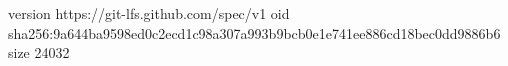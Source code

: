 version https://git-lfs.github.com/spec/v1
oid sha256:9a644ba9598ed0c2ecd1c98a307a993b9bcb0e1e741ee886cd18bec0dd9886b6
size 24032
